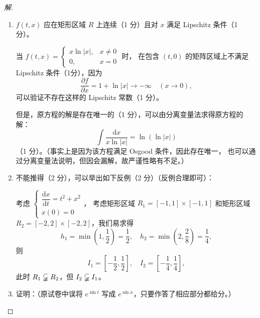 \begin{proof}[解]
\begin{enumerate}[label=(\arabic*)]
\item $f(t,x)$ 应在矩形区域 $R$ 上连续（1 分）且对 $x$ 满足 Lipschitz 条件（1 分）。

当 $f(t,x)=\begin{cases}x \ln |x|, & x \neq 0 \\ 0, & x=0\end{cases}$ 时，
在包含 $(t,0)$ 的矩阵区域上不满足 Lipschitz 条件（1分），因为
\[\frac{\partial f}{\partial x}=1+\ln |x| \rightarrow-\infty\quad(x \rightarrow 0),\]
可以验证不存在这样的 Lipschitz 常数（1 分）。

但是，原方程的解是存在唯一的（1 分），可以由分离变量法求得原方程的解：
\[\int \frac{\mathrm{d} x}{x \ln |x|}=\ln (\ln |x|)\]
（1 分）。（事实上是因为该方程满足 Osgood 条件，因此存在唯一，
也可以通过分离变量法说明，但因会漏解，故严谨性略有不足。）

\item 不能推得（2 分），可以举出如下反例（2 分）（反例合理即可）：

考虑 $\begin{cases}\dfrac{\mathrm{d}x}{\mathrm{d}t}=t^{2}+x^{2} \\ x(0)=0\end{cases}$，
考虑矩形区域 $R_{1}=[-1,1] \times[-1,1]$ 和矩形区域 $R_{2}=[-2,2] \times [-2,2]$，我们易求得
\[h_{1}=\min \left(1, \frac{1}{2}\right)=\frac{1}{2}, \quad 
h_{2}=\min \left(2, \frac{2}{8}\right)=\frac{1}{4},\]
则 \[I_{1}=\left[-\frac{1}{2}, \frac{1}{2}\right], \quad 
I_{2}=\left[-\frac{1}{4}, \frac{1}{4}\right],\]
此时 $R_{1} \varsubsetneqq R_{2}$，但 $I_{2} \varsubsetneqq I_{1}$。

\item 证明：（原试卷中误将 $e^{\sin t}$ 写成 $e^{\sin x}$，只要作答了相应部分都给分。）


\end{enumerate}
\end{proof}
